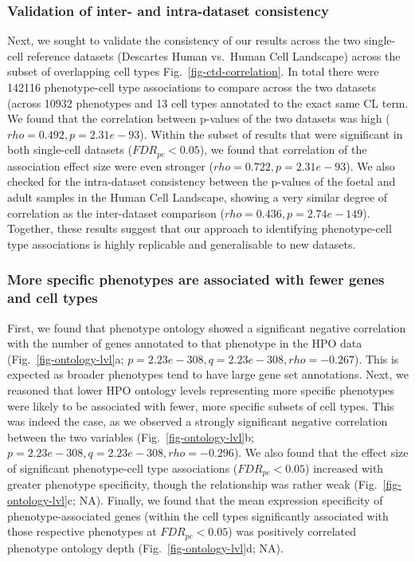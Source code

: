 \documentclass[
]{agujournal2019}
\begin{document}
\subsubsection{Validation of inter- and intra-dataset
consistency}\label{validation-of-inter--and-intra-dataset-consistency}

Next, we sought to validate the consistency of our results across the
two single-cell reference datasets (Descartes Human vs.~Human Cell
Landscape) across the subset of overlapping cell types
Fig.~\ref{fig-ctd-correlation}. In total there were 142116
phenotype-cell type associations to compare across the two datasets
(across 10932 phenotypes and 13 cell types annotated to the exact same
CL term. We found that the correlation between p-values of the two
datasets was high (\(rho=0.492, p=2.31e-93\)). Within the subset of
results that were significant in both single-cell datasets
(\(FDR_{pc}<0.05\)), we found that correlation of the association effect
size were even stronger (\(rho=0.722, p=2.31e-93\)). We also checked for
the intra-dataset consistency between the p-values of the foetal and
adult samples in the Human Cell Landscape, showing a very similar degree
of correlation as the inter-dataset comparison
(\(rho=0.436, p=2.74e-149\)). Together, these results suggest that our
approach to identifying phenotype-cell type associations is highly
replicable and generalisable to new datasets.

\subsubsection{More specific phenotypes are associated with fewer genes
and cell
types}\label{more-specific-phenotypes-are-associated-with-fewer-genes-and-cell-types}

First, we found that phenotype ontology showed a significant negative
correlation with the number of genes annotated to that phenotype in the
HPO data (Fig.~\ref{fig-ontology-lvl}a;
\(p=2.23e-308, q=2.23e-308, rho=-0.267\)). This is expected as broader
phenotypes tend to have large gene set annotations. Next, we reasoned
that lower HPO ontology levels representing more specific phenotypes
were likely to be associated with fewer, more specific subsets of cell
types. This was indeed the case, as we observed a strongly significant
negative correlation between the two variables
(Fig.~\ref{fig-ontology-lvl}b;
\(p=2.23e-308, q=2.23e-308, rho=-0.296\)). We also found that the effect
size of significant phenotype-cell type associations (\(FDR_{pc}<0.05\))
increased with greater phenotype specificity, though the relationship
was rather weak (Fig.~\ref{fig-ontology-lvl}c; NA). Finally, we found
that the mean expression specificity of phenotype-associated genes
(within the cell types significantly associated with those respective
phenotypes at \(FDR_{pc}<0.05\)) was positively correlated phenotype
ontology depth (Fig.~\ref{fig-ontology-lvl}d; NA).
\end{document}
